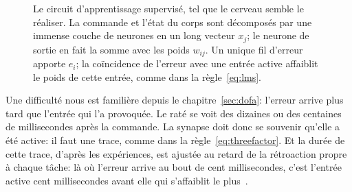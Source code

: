 \begin{figure}[t]
\centering
\ifLuaTeX\else{}\fi%
\ifLuaTeX\else{}\fi
\caption{Le circuit d'apprentissage supervisé, tel que le cerveau semble le réaliser. La commande et l'état du corps sont décomposés par une immense couche de neurones  en un long vecteur $x_j$; le neurone  de sortie en fait la somme avec les poids $w_{ij}$. Un unique fil d'erreur apporte $e_i$; la coïncidence de l'erreur avec une entrée active affaiblit le poids de cette entrée, comme dans la règle~\eqref{eq:lms}.}
\label{fig:errorwire}
\end{figure}

Une difficulté nous est familière depuis le chapitre~\ref{sec:dofa}: l'erreur arrive plus tard que l'entrée qui l'a provoquée. Le raté se voit des dizaines ou des centaines de millisecondes après la commande. La synapse doit donc se souvenir qu'elle a été active: il faut une trace, comme dans la règle~\eqref{eq:threefactor}. Et la durée de cette trace, d'après les expériences, est ajustée au retard de la rétroaction propre à chaque tâche: là où l'erreur arrive au bout de cent millisecondes, c'est l'entrée active cent millisecondes avant elle qui s'affaiblit le plus~\cite{Suvrathan2016}.

